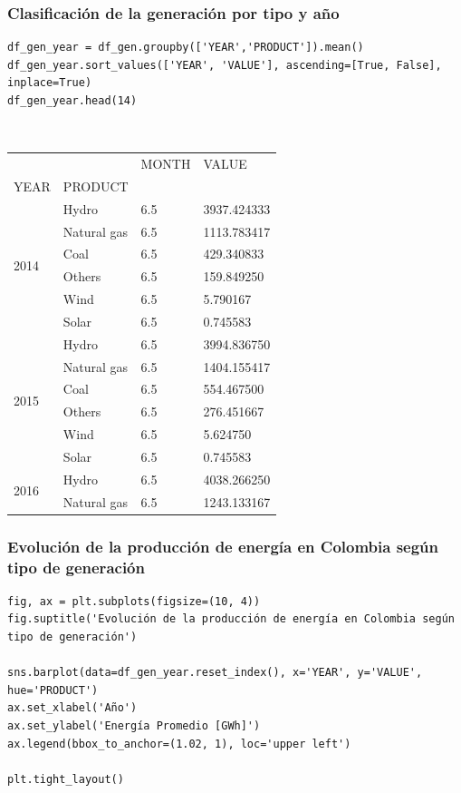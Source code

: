 \documentclass{article}
\begin{document}
\subsubsection{Clasificaci\'on de la generaci\'on por tipo y a\~no}

\begin{verbatim}
df_gen_year = df_gen.groupby(['YEAR','PRODUCT']).mean()
df_gen_year.sort_values(['YEAR', 'VALUE'], ascending=[True, False], inplace=True)
df_gen_year.head(14)
\end{verbatim}

{\tt
	\begin{tabular}{llll}
		&             & MONTH & VALUE       \\
		YEAR                  & PRODUCT     &       &             \\
		\multirow{6}{*}{2014} & Hydro       & 6.5   & 3937.424333 \\
		& Natural gas & 6.5   & 1113.783417 \\
		& Coal        & 6.5   & 429.340833  \\
		& Others      & 6.5   & 159.849250  \\
		& Wind        & 6.5   & 5.790167    \\
		& Solar       & 6.5   & 0.745583    \\
		\multirow{6}{*}{2015} & Hydro       & 6.5   & 3994.836750 \\
		& Natural gas & 6.5   & 1404.155417 \\
		& Coal        & 6.5   & 554.467500  \\
		& Others      & 6.5   & 276.451667  \\
		& Wind        & 6.5   & 5.624750    \\
		& Solar       & 6.5   & 0.745583    \\
		\multirow{2}{*}{2016} & Hydro       & 6.5   & 4038.266250 \\
		& Natural gas & 6.5   & 1243.133167
	\end{tabular}
}

\subsubsection{Evolución de la producción de energía en Colombia según tipo de generación}

\begin{verbatim}
fig, ax = plt.subplots(figsize=(10, 4))
fig.suptitle('Evolución de la producción de energía en Colombia según tipo de generación')

sns.barplot(data=df_gen_year.reset_index(), x='YEAR', y='VALUE', hue='PRODUCT')
ax.set_xlabel('Año')
ax.set_ylabel('Energía Promedio [GWh]')
ax.legend(bbox_to_anchor=(1.02, 1), loc='upper left')

plt.tight_layout()
\end{verbatim}
\end{document}
